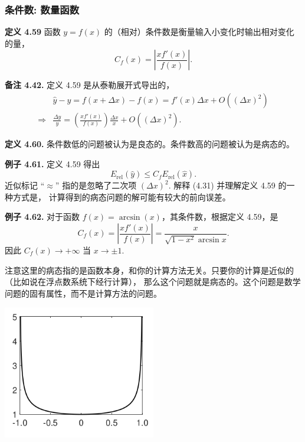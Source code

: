 \documentclass[a4paper]{ctexart}
\begin{document}
{%


\subsubsection{条件数: 数量函数}

\noindent \textbf{定义 4.59 } 函数 $y = f(x)$ 的（相对）条件数是衡量输入小变化时输出相对变化的量，
\[
  C_f(x) = \left|\frac{xf'(x)}{f(x)}\right|. \tag{4.30}
\]

\noindent \textbf{备注 4.42.} 定义 4.59 是从泰勒展开式导出的，
\begin{align*}
  & \hat{y} - y = f(x + \Delta x) - f(x) = f'(x)\Delta x + O((\Delta x)^2) \\
\Rightarrow & \frac{\Delta y}{y} = \left(\frac{xf'(x)}{f(x)}\right)\frac{\Delta x}{x} + O((\Delta x)^2).
\end{align*}

\noindent \textbf{定义 4.60.} 条件数低的问题被认为是良态的。条件数高的问题被认为是病态的。

\noindent \textbf{例子 4.61.} 定义 4.59 得出
\[
  E_{\text{rel}}(\hat{y}) \leq C_f E_{\text{rel}}(\hat{x}). \tag{4.31}
\]
近似标记 ``$\approx$'' 指的是忽略了二次项 $(\Delta x)^2$. 解释 (4.31) 并理解定义 4.59 的一种方式是，
计算得到的病态问题的解可能有较大的前向误差。

\noindent \textbf{例子 4.62.} 对于函数 $f(x) = \arcsin(x)$，其条件数，根据定义 4.59，是
\[
  C_f(x) = \left|\frac{xf'(x)}{f(x)}\right| = \frac{x}{\sqrt{1 - x^2} \arcsin x}.
\]
因此 $C_f(x) \rightarrow +\infty$ 当 $x \rightarrow \pm 1$.

注意这里的病态指的是函数本身，和你的计算方法无关。只要你的计算是近似的（比如说在浮点数系统下经行计算），
那么这个问题就是病态的。这个问题是数学问题的固有属性，而不是计算方法的问题。

\begin{center}
  \includegraphics[width = 0.5\textwidth]{images/arcsin.png}
\end{center}

}
\end{document}
